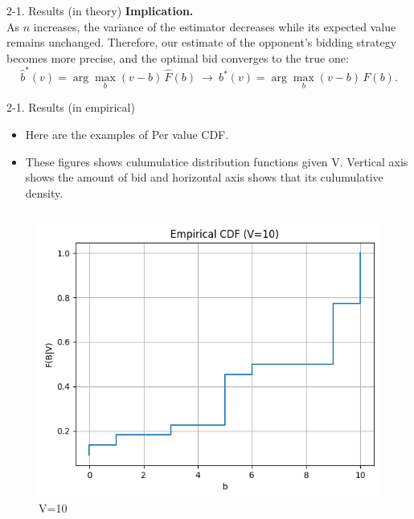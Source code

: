 \documentclass{beamer}
\begin{document}
\begin{frame}{2-1. Results (in theory)}
\textbf{Implication.}\\
As $n$ increases, the variance of the estimator decreases
while its expected value remains unchanged.
Therefore, our estimate of the opponent’s bidding strategy
becomes more precise, and the optimal bid converges to the true one:
\[
\hat b^*(v)=\arg\max_{b}(v-b)\,\hat F(b)
\ \longrightarrow\
b^*(v)=\arg\max_{b}(v-b)\,F(b).
\]
\end{frame}

\begin{frame}{2-1. Results (in empirical)}
\begin{itemize}
    \item Here are the examples of Per value CDF.\\
    \item These figures shows culumulatice distribution functions given V. Vertical axis shows the amount of bid and horizontal axis shows that its culumulative density.
\end{itemize}
\begin{columns}[T,onlytextwidth]
  \begin{figure}
    \centering
    \includegraphics[width=\linewidth]{332Project1/figures/v=10.png}
    \caption{V=10}\label{fig:v10}
  \end{figure}


\end{columns}
\end{frame}
\end{document}
